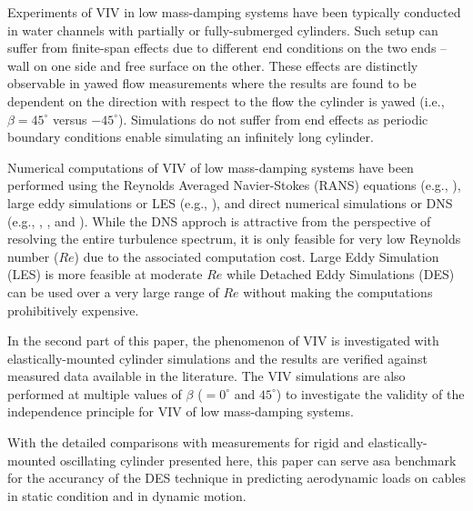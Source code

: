 Experiments of VIV in low mass-damping systems have been typically conducted in
water channels with partially or fully-submerged cylinders. Such setup can
suffer from finite-span effects due to different end conditions on the two ends
-- wall on one side and free surface on the other. These effects are distinctly
observable in yawed flow measurements where the results are found to be
dependent on the direction with respect to the flow the cylinder is yawed
(i.e., $\beta=45^\circ$ versus $-45^\circ$). Simulations do not suffer from end
effects as periodic boundary conditions enable simulating an infinitely long
cylinder. 

Numerical computations of VIV of low mass-damping systems have been performed
using the Reynolds Averaged Navier-Stokes (RANS) equations (e.g.,
\citet{guilmineau2004numerical}), large eddy simulations or LES (e.g.,
\citet{al2004vortex}), and direct numerical simulations or DNS (e.g.,
\citet{lucor2005vortex}, \citet{evangelinos2000dns}, and \citet{dong2005dns}).
While the DNS approch is attractive from the perspective of resolving the
entire turbulence spectrum, it is only feasible for very low Reynolds number
($Re$) due to the associated computation cost. Large Eddy Simulation (LES) is
more feasible at moderate $Re$ while Detached Eddy Simulations (DES) can be
used over a very large range of $Re$ without making the computations
prohibitively expensive. 

In the second part of this paper, the phenomenon of VIV is investigated with
elastically-mounted cylinder simulations and the results are verified against
measured data available in the literature. The VIV simulations are also
performed at multiple values of $\beta$ ($=0^\circ$ and $45^\circ$) to
investigate the validity of the independence principle for VIV of low
mass-damping systems.

With the detailed comparisons with measurements for rigid and
elastically-mounted oscillating cylinder presented here, this paper can serve
asa benchmark for the accurancy of the DES technique in predicting aerodynamic
loads on cables in static condition and in dynamic motion.
